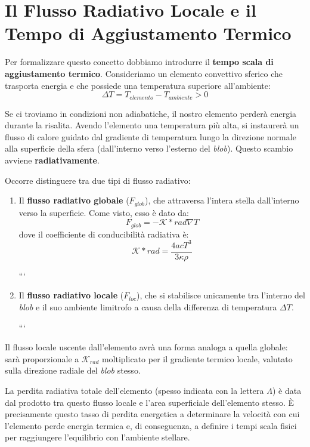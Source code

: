 \section{Il Flusso Radiativo Locale e il Tempo di Aggiustamento Termico}

Per formalizzare questo concetto dobbiamo introdurre il \textbf{tempo scala di aggiustamento termico}.
Consideriamo un elemento convettivo sferico che trasporta energia e che possiede una temperatura superiore all'ambiente:
\begin{equation}
\Delta T = T_{elemento} - T_{ambiente} > 0
\end{equation}

Se ci troviamo in condizioni non adiabatiche, il nostro elemento perderà energia durante la risalita. Avendo l'elemento una temperatura più alta, si instaurerà un flusso di calore guidato dal gradiente di temperatura lungo la direzione normale alla superficie della sfera (dall'interno verso l'esterno del \textit{blob}). Questo scambio avviene \textbf{radiativamente}.

Occorre distinguere tra due tipi di flusso radiativo:
\begin{enumerate}
\item Il \textbf{flusso radiativo globale} ($F_{glob}$), che attraversa l'intera stella dall'interno verso la superficie. Come visto, esso è dato da:
\begin{equation}
F_{glob} = - \mathcal{K}*{rad} \nabla T
\end{equation}
dove il coefficiente di conducibilità radiativa è:
\begin{equation}
\mathcal{K}*{rad} = \frac{4 a c T^3}{3 \kappa \rho}
\end{equation}

```
\item Il \textbf{flusso radiativo locale} ($F_{loc}$), che si stabilisce unicamente tra l'interno del \textit{blob} e il suo ambiente limitrofo a causa della differenza di temperatura $\Delta T$.

```

\end{enumerate}

Il flusso locale uscente dall'elemento avrà una forma analoga a quella globale: sarà proporzionale a $\mathcal{K}_{rad}$ moltiplicato per il gradiente termico locale, valutato sulla direzione radiale del \textit{blob} stesso.

La perdita radiativa totale dell'elemento (spesso indicata con la lettera $\Lambda$) è data dal prodotto tra questo flusso locale e l'area superficiale dell'elemento stesso. È precisamente questo tasso di perdita energetica a determinare la velocità con cui l'elemento perde energia termica e, di conseguenza, a definire i tempi scala fisici per raggiungere l'equilibrio con l'ambiente stellare.

